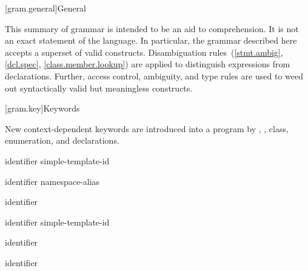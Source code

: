
[gram.general]{General}

\pnum
{}%
%
This summary of \Cpp{} grammar is intended to be an aid to comprehension.
It is not an exact statement of the language.
In particular, the grammar described here accepts
a superset of valid \Cpp{} constructs.
Disambiguation rules~(\ref{stmt.ambig}, \ref{dcl.spec}, \ref{class.member.lookup})
are applied to distinguish expressions from declarations.
Further, access control, ambiguity, and type rules are used
to weed out syntactically valid but meaningless constructs.

[gram.key]{Keywords}

\pnum
{}%
New context-dependent keywords are introduced into a program by
,
,
class, enumeration, and
declarations.

\begin{ncbnf}
\br
	identifier\br
	simple-template-id
\end{ncbnf}

\begin{ncbnf}
\br
	identifier\br
	namespace-alias
\end{ncbnf}

\begin{ncbnf}
\br
	identifier
\end{ncbnf}

\begin{ncbnf}
\br
	identifier\br
	simple-template-id
\end{ncbnf}

\begin{ncbnf}
\br
	identifier
\end{ncbnf}

\begin{ncbnf}
\br
	identifier
\end{ncbnf}

\FlushAndPrintGrammar
